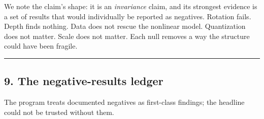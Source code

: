 \documentclass[
  11pt,
]{article}
\begin{document}
We note the claim's shape: it is an \emph{invariance} claim, and its
strongest evidence is a set of results that would individually be
reported as negatives. Rotation fails. Depth finds nothing. Data does
not rescue the nonlinear model. Quantization does not matter. Scale does
not matter. Each null removes a way the structure could have been
fragile.

\begin{center}\rule{0.5\linewidth}{0.5pt}\end{center}

\subsection{9. The negative-results
ledger}\label{the-negative-results-ledger}

The program treats documented negatives as first-class findings; the
headline could not be trusted without them.
\end{document}
